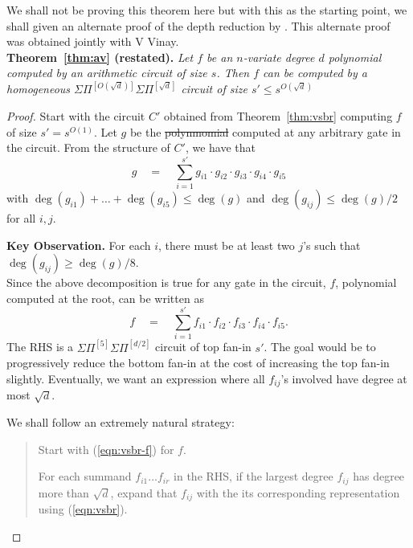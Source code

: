 \documentclass{beatcs}
\newcommand{\spaced}[1]{\quad#1\quad}
\newcommand{\SPSPfanin}[2]{\Sigma\Pi^{[#1]}\Sigma\Pi^{[#2]}}
\providecommand{\DIFaddtex}[1]{{\protect\color{blue}\uwave{#1}}} %
\providecommand{\DIFdeltex}[1]{{\protect\color{red}\sout{#1}}}                      %
\providecommand{\DIFaddbegin}{} %
\providecommand{\DIFaddend}{} %
\providecommand{\DIFdelbegin}{} %
\providecommand{\DIFdelend}{} %
\providecommand{\DIFadd}[1]{\texorpdfstring{\DIFaddtex{#1}}{#1}} %
\providecommand{\DIFdel}[1]{\texorpdfstring{\DIFdeltex{#1}}{}} %
\begin{document}
\bigskip 

We shall not be proving this theorem here but with this as the starting point, we shall given an alternate proof of the depth reduction by \cite{av08,koiran,Tav13}. This alternate proof was obtained jointly with V Vinay. \\

{\bf Theorem~\ref{thm:av} (restated). }{\em 
  Let $f$ be an $n$-variate degree $d$ polynomial computed by an arithmetic circuit of size $s$. Then $f$ can be computed by a homogeneous $\SPSPfanin{O(\sqrt{d})}{\sqrt{d}}$ circuit of size $s' \leq s^{O(\sqrt{d})}$
}

\begin{proof}
Start with the circuit $C'$ obtained from Theorem~\ref{thm:vsbr} computing $f$ of size $s' = s^{O(1)}$. Let $g$ be the \DIFdelbegin \DIFdel{polynmomial }\DIFdelend \DIFaddbegin \DIFadd{polynomial }\DIFaddend computed at any arbitrary gate in the circuit. From the structure of $C'$, we have that
\begin{equation}\label{eqn:vsbr}
g \spaced{=} \sum_{i=1}^{s'} g_{i1}\cdot g_{i2}\cdot g_{i3}\cdot g_{i4}\cdot g_{i5}
\end{equation}
with $\deg(g_{i1}) + \dots + \deg(g_{i5}) \leq \deg(g)$ and $\deg(g_{ij})\leq \deg(g)/2$ for all $i,j$. 

{\bf Key Observation. } For each $i$, there must be at least two $j$'s such that $\deg(g_{ij}) \geq \deg(g)/8$. \\

Since the above decomposition is true for any gate in the circuit, $f$,  polynomial computed at the root, can be written as
\begin{equation}\label{eqn:vsbr-f}
f \spaced{=} \sum_{i=1}^{s'} f_{i1}\cdot f_{i2}\cdot f_{i3}\cdot f_{i4}\cdot f_{i5}. 
\end{equation}
The RHS is a $\SPSPfanin{5}{d/2}$  circuit of top fan-in $s'$. The goal would be to progressively reduce the bottom fan-in at the cost of increasing the top fan-in slightly. Eventually, we want an expression where all $f_{ij}$'s involved have degree at most $\sqrt{d}$. 

We shall follow an extremely natural strategy: 
\begin{mdframed}
\begin{quote}
Start with (\ref{eqn:vsbr-f}) for $f$. 

For each summand $f_{i1}\dots f_{ir}$ in the RHS, if the largest degree $f_{ij}$ has degree more than $\sqrt{d}$, expand that $f_{ij}$ with the its corresponding representation using (\ref{eqn:vsbr}). 


\end{quote}
\end{mdframed}
\end{proof}
\end{document}
